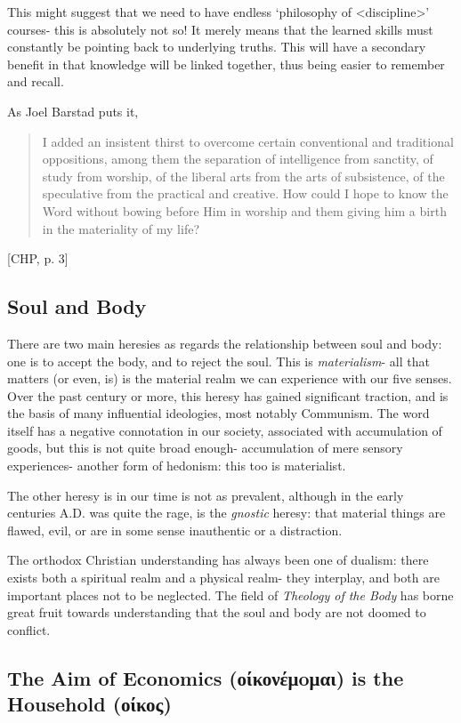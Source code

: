 \documentclass[letterpaper]{article}
\begin{document}
This might suggest that we need to have endless `philosophy of <discipline>' courses- this is absolutely not so! It merely means that the learned skills must constantly be pointing back to underlying truths. This will have a secondary benefit in that knowledge will be linked together, thus being easier to remember and recall.

As Joel Barstad puts it,

\begin{quote}
  I added an insistent thirst to overcome certain conventional and traditional oppositions, among them the separation of intelligence from sanctity, of study from worship, of the liberal arts from the arts of subsistence, of the speculative from the practical and creative. How could I hope to know the Word without bowing before Him in worship and them giving him a birth in the materiality of my life?
\end{quote} [CHP, p. 3]

\subsection{Soul and Body}

There are two main heresies as regards the relationship between soul and body: one is to accept the body, and to reject the soul. This is \textit{materialism}- all that matters (or even, is) is the material realm we can experience with our five senses. Over the past century or more, this heresy has gained significant traction, and is the basis of many influential ideologies, most notably Communism. The word itself has a negative connotation in our society, associated with accumulation of goods, but this is not quite broad enough- accumulation of mere sensory experiences- another form of hedonism: this too is materialist.

The other heresy is in our time is not as prevalent, although in the early centuries A.D. was quite the rage, is the \textit{gnostic} heresy: that material things are flawed, evil, or are in some sense inauthentic or a distraction.

The orthodox Christian understanding has always been one of dualism: there exists both a spiritual realm and a physical realm- they interplay, and both are important places not to be neglected. The field of \textit{Theology of the Body} has borne great fruit towards understanding that the soul and body are not doomed to conflict.

\subsection{The Aim of Economics (οίκονέμoμαι) is the Household (οίκος)}
\end{document}
